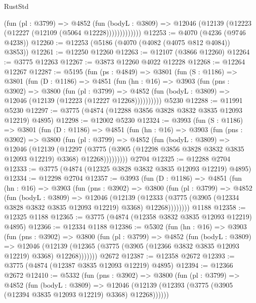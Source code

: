 \begin{lexlean}{RustStd}
\begin{coremodule}
                (fun (pl : @3799) =>
                @4852
                  (fun (bodyL : @3809) =>
                  @12046 (@12139 (@12223 (@12227 (@12109 (@5064 @12228)))))))))))))
@12253 := @4070 (@4236 (@9746 @4238))
@12260 := @12253 (@5186 (@4070 (@4082 (@4075 @812 @4084)) @3853))
@12261 := @12250 @12260
@12263 := @12107 (@3866 @12260)
@12264 := @3775 @12263
@12267 := @3873 @12260 @4022 @12228
@12268 := @12264 @12267
@12287 := @5195
    (fun (ps : @4849) =>
    @3801
      (fun (S : @1186) =>
      @3801
        (fun (D : @1186) =>
        @4851
          (fun (hn : @16) =>
          @3903
            (fun (pns : @3902) =>
            @3800
              (fun (pl : @3799) =>
              @4852 (fun (bodyL : @3809) => @12046 (@12139 (@12223 (@12227 @12268))))))))))
    @5230
@12288 := @11991 @5230
@12297 := @3775 (@4874 (@12288 @3856 @3828 @3832 @3835 @12093 @12219) @4895)
@12298 := @12002 @5230
@12324 := @3993
    (fun (S : @1186) =>
    @3801
      (fun (D : @1186) =>
      @4851
        (fun (hn : @16) =>
        @3903
          (fun (pns : @3902) =>
          @3800
            (fun (pl : @3799) =>
            @4852
              (fun (bodyL : @3809) =>
              @12046
                (@12139
                  (@12297
                    (@3775
                      (@3905 (@12298 @3856 @3828 @3832 @3835 @12093 @12219) @3368)
                      @12268)))))))))
    @2704
@12325 := @12288 @2704
@12333 := @3775 (@4874 (@12325 @3828 @3832 @3835 @12093 @12219) @4895)
@12334 := @12298 @2704
@12357 := @3993
    (fun (D : @1186) =>
    @4851
      (fun (hn : @16) =>
      @3903
        (fun (pns : @3902) =>
        @3800
          (fun (pl : @3799) =>
          @4852
            (fun (bodyL : @3809) =>
            @12046
              (@12139
                (@12333 (@3775 (@3905 (@12334 @3828 @3832 @3835 @12093 @12219) @3368) @12268))))))))
    @1188
@12358 := @12325 @1188
@12365 := @3775 (@4874 (@12358 @3832 @3835 @12093 @12219) @4895)
@12366 := @12334 @1188
@12386 := @5302
    (fun (hn : @16) =>
    @3903
      (fun (pns : @3902) =>
      @3800
        (fun (pl : @3799) =>
        @4852
          (fun (bodyL : @3809) =>
          @12046
            (@12139 (@12365 (@3775 (@3905 (@12366 @3832 @3835 @12093 @12219) @3368) @12268)))))))
    @2672
@12387 := @12358 @2672
@12393 := @3775 (@4874 (@12387 @3835 @12093 @12219) @4895)
@12394 := @12366 @2672
@12410 := @5332
    (fun (pns : @3902) =>
    @3800
      (fun (pl : @3799) =>
      @4852
        (fun (bodyL : @3809) =>
        @12046 (@12139 (@12393 (@3775 (@3905 (@12394 @3835 @12093 @12219) @3368) @12268))))))

\end{coremodule}
\end{lexlean}
